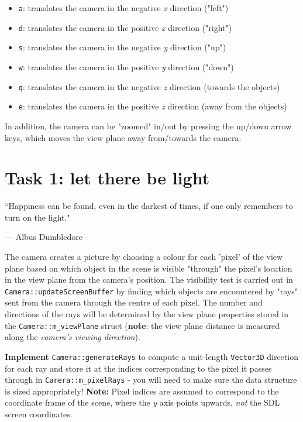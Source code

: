 \documentclass{../../../fal_assignment}
\begin{document}
\begin{itemize}
	\item \lstinline{a}: translates the camera in the negative \textit{x} direction ("left")
	\item \lstinline{d}: translates the camera in the positive \textit{x} direction ("right")
	\item \lstinline{s}: translates the camera in the negative \textit{y} direction ("up")
	\item \lstinline{w}: translates the camera in the positive \textit{y} direction ("down")
	\item \lstinline{q}:  translates the camera in the negative \textit{z} direction (towards the objects)
	\item \lstinline{e}:  translates the camera in the positive \textit{z} direction (away from the objects)
\end{itemize}

In addition, the camera can be "zoomed" in/out by pressing the up/down arrow keys, which moves the view plane away from/towards the camera.

\section*{Task 1: let there be light}

\begin{marginquote}
``Happiness can be found, even in the darkest of times, if one only remembers to turn on the light."

\par --- Albus Dumbledore
\end{marginquote}

The camera creates a picture by choosing a colour for each 'pixel' of the view plane based on which object in the scene is visible "through" the pixel's location in the view plane from the camera's position. The visibility test is carried out in \lstinline{Camera::updateScreenBuffer} by finding which objects are encountered by "rays" sent from the camera through the centre of each pixel. The number and directions of the rays will be determined by the view plane properties stored in the \lstinline{Camera::m_viewPlane} struct (\textbf{note}: the view plane distance is measured along the \textit{camera's viewing direction}).

\textbf{Implement} \lstinline{Camera::generateRays} to compute a unit-length \lstinline{Vector3D} direction for each ray and store it at the indices corresponding to the pixel it passes through in \lstinline{Camera::m_pixelRays} - you will need to make sure the data structure is sized appropriately!
\textbf{Note:} Pixel indices are assumed to correspond to the coordinate frame of the scene, where the \textit{y} axis points upwards, \textit{not} the SDL screen coordinates.
\end{document}
